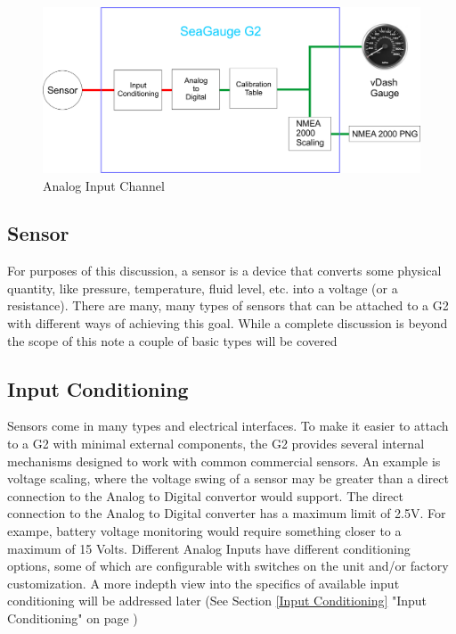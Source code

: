 \documentclass[12pt, letterpaper, twoside, titlepage]{article}
\begin{document}
\begin{figure}[hbt!]
  \includegraphics[width=\linewidth]{Sensor Example.png}
  \centering
  \caption{Analog Input Channel}
  \label{fig:Analog_Input}
\end{figure}


\subsection{Sensor}
For purposes of this discussion, a sensor is a device that converts some physical quantity, like pressure, temperature, fluid level, etc. into a voltage (or a resistance).  There are many, many types of sensors that can be attached to a G2 with different ways of achieving this goal. While a complete discussion is beyond the scope of this note a couple of basic types will be covered 

\subsection{Input Conditioning}
Sensors come in many types and electrical interfaces.  To make it easier to attach to a G2 with minimal external components, the G2 provides several internal mechanisms designed to work with common commercial sensors. An example is voltage scaling, where the voltage swing of a sensor may be greater than a direct connection to the Analog to Digital convertor would support.  The direct connection to the Analog to Digital converter has a maximum limit of 2.5V.  For exampe, battery voltage monitoring would require something closer to a maximum of 15 Volts. Different Analog Inputs have different conditioning options, some of which are configurable with switches on the unit and/or factory customization.  A more indepth view into the specifics of available input conditioning will be addressed later (See  Section \ref{Input Conditioning} "Input Conditioning" on page \pageref{Input Conditioning})
\end{document}
